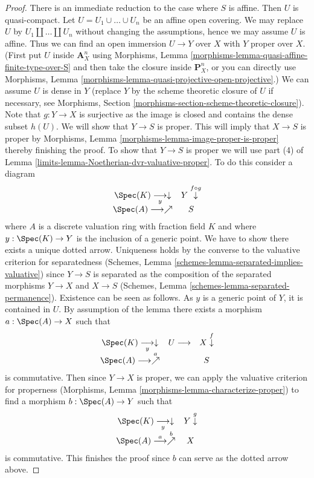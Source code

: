 \begin{proof}

There is an immediate reduction to the case where $S$ is affine.
Then $U$ is quasi-compact.
Let $U = U_1 \cup \ldots \cup U_n$ be an affine open covering.
We may replace $U$ by $U_1 \amalg \ldots \amalg U_n$ without
changing the assumptions, hence we may assume $U$ is affine.
Thus we can find an open immersion $U \to Y$ over $X$
with $Y$ proper over $X$. (First put $U$ inside $\mathbf{A}^n_X$
using Morphisms, Lemma \ref{morphisms-lemma-quasi-affine-finite-type-over-S}
and then take the closure inside $\mathbf{P}^n_X$, or you can directly
use Morphisms, Lemma \ref{morphisms-lemma-quasi-projective-open-projective}.)
We can assume $U$ is dense in $Y$ (replace $Y$ by the scheme theoretic
closure of $U$ if necessary, see Morphisms, Section
\ref{morphisms-section-scheme-theoretic-closure}).
Note that $g : Y \to X$ is surjective as the image is closed
and contains the dense subset $h(U)$.
We will show that $Y \to S$ is proper. This will imply that
$X \to S$ is proper by
Morphisms, Lemma \ref{morphisms-lemma-image-proper-is-proper}
thereby finishing the proof.
To show that $Y \to S$ is proper we will use
part (4) of Lemma \ref{limits-lemma-Noetherian-dvr-valuative-proper}.
To do this consider a diagram
$$
\begin{array}{cc}\Spec(K) \underset{y}{\longrightarrow}\downarrow & Y \overset{f \circ g}{\downarrow} \\ \Spec(A) \longrightarrow\nearrow & S\end{array}
$$
where $A$ is a discrete valuation ring with fraction field $K$
and where $y : \Spec(K) \to Y$ is the inclusion of a generic point.
We have to show there exists a unique dotted arrow.
Uniqueness holds by the converse to the valuative criterion
for separatedness
(Schemes, Lemma \ref{schemes-lemma-separated-implies-valuative})
since $Y \to S$ is separated as the
composition of the separated morphisms $Y \to X$ and $X \to S$
(Schemes, Lemma \ref{schemes-lemma-separated-permanence}).
Existence can be seen as follows.
As $y$ is a generic point of $Y$, it is contained in $U$.
By assumption of the lemma
there exists a morphism $a : \Spec(A) \to X$ such that
$$
\begin{array}{ccc}\Spec(K) \underset{y}{\longrightarrow}\downarrow & U \longrightarrow & X \overset{f}{\downarrow} \\ \Spec(A) \longrightarrow\overset{a}{\nearrow} &  & S\end{array}
$$
is commutative. Then since $Y \to X$ is proper, we can
apply the valuative criterion for properness
(Morphisms, Lemma \ref{morphisms-lemma-characterize-proper})
to find a morphism $b : \Spec(A) \to Y$ such that
$$
\begin{array}{cc}\Spec(K) \underset{y}{\longrightarrow}\downarrow & Y \overset{g}{\downarrow} \\ \Spec(A) \overset{a}{\longrightarrow}\overset{b}{\nearrow} & X\end{array}
$$
is commutative. This finishes the proof since
$b$ can serve as the dotted arrow above.
\end{proof}

